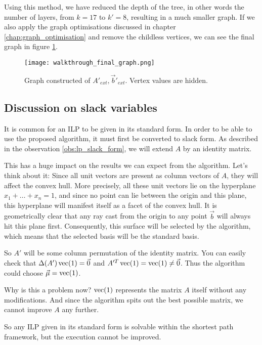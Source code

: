 Using this method, we have reduced the depth of the tree, in other words the number of layers, from $k=17$ to $k'=8$, resulting in a much smaller graph. If we also apply the graph optimisations discussed in chapter \ref{chap:graph_optimisation} and remove the childless vertices, we can see the final graph in figure \ref{fig:walkthrough_final_graph}.
\begin{figure}[h]
    \centering
    \texttt{[image: walkthrough\_final\_graph.png]}
    \caption{\label{fig:walkthrough_final_graph} Graph constructed of $A'_{ext}, \vec b'_{ext}$. Vertex values are hidden.}
\end{figure}

\subsection{Discussion on slack variables}
It is common for an ILP to be given in its standard form. In order to be able to use the proposed algorithm, it must first be converted to slack form. As described in the observation \ref{obs:lp_slack_form}, we will extend $A$ by an identity matrix.

This has a huge impact on the results we can expect from the algorithm. Let's think about it: Since all unit vectors are present as column vectors of $A$, they will affect the convex hull. More precisely, all these unit vectors lie on the hyperplane $x_1 + \dots + x_n = 1$, and since no point can lie between the origin and this plane, this hyperplane will manifest itself as a facet of the convex hull. It is geometrically clear that any ray cast from the origin to any point $\vec b$ will always hit this plane first. Consequently, this surface will be selected by the algorithm, which means that the selected basis will be the standard basis.

So $A'$ will be some column permutation of the identity matrix. You can easily check that $\Delta(A')\operatorname{vec}(1) = \vec 0$ and $A'^T\operatorname{vec}(1) = \operatorname{vec}(1) \neq \vec0$. Thus the algorithm could choose $\vec\mu = \operatorname{vec}(1)$.

Why is this a problem now? $\operatorname{vec}(1)$ represents the matrix $A$ itself without any modifications. And since the algorithm spits out the best possible matrix, we cannot improve $A$ any further.

So any ILP given in its standard form is solvable within the shortest path framework, but the execution cannot be improved.